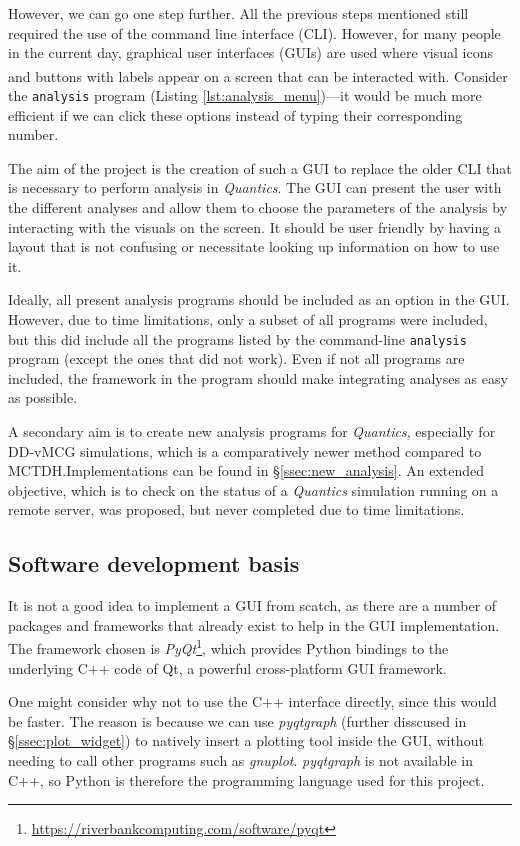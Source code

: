 \documentclass[12pt]{article}
\begin{document}
However, we can go one step further. All the previous steps mentioned still required the use of the command line interface (CLI). However, for many people in the current day, graphical user interfaces (GUIs) are used where visual icons and buttons with labels appear on a screen that can be interacted with.\textsuperscript{\cite{risegui}} Consider the \texttt{analysis} program (Listing \ref{lst:analysis_menu})---it would be much more efficient if we can click these options instead of typing their corresponding number.

The aim of the project is the creation of such a GUI to replace the older CLI that is necessary to perform analysis in \textit{Quantics}. The GUI can present the user with the different analyses and allow them to choose the parameters of the analysis by interacting with the visuals on the screen. It should be user friendly by having a layout that is not confusing or necessitate looking up information on how to use it.

Ideally, all present analysis programs should be included as an option in the GUI. However, due to time limitations, only a subset of all programs were included, but this did include all the programs listed by the command-line \texttt{analysis} program (except the ones that did not work). Even if not all programs are included, the framework in the program should make integrating analyses as easy as possible.

A secondary aim is to create new analysis programs for \textit{Quantics}, especially for DD-vMCG simulations, which is a comparatively newer method compared to MCTDH.Implementations can be found in \S\ref{ssec:new_analysis}. An extended objective, which is to check on the status of a \textit{Quantics} simulation running on a remote server, was proposed, but never completed due to time limitations.

\subsection{Software development basis}\label{ssec:dev}

It is not a good idea to implement a GUI from scatch, as there are a number of packages and frameworks that already exist to help in the GUI implementation. The framework chosen is \textit{PyQt}\footnote{\url{https://riverbankcomputing.com/software/pyqt}}, which provides Python bindings to the underlying C++ code of Qt, a powerful cross-platform GUI framework.

One might consider why not to use the C++ interface directly, since this would be faster. The reason is because we can use \textit{pyqtgraph} (further disscused in \S\ref{ssec:plot_widget}) to natively insert a plotting tool inside the GUI, without needing to call other programs such as \textit{gnuplot}. \textit{pyqtgraph} is not available in C++, so Python is therefore the programming language used for this project.
\end{document}
